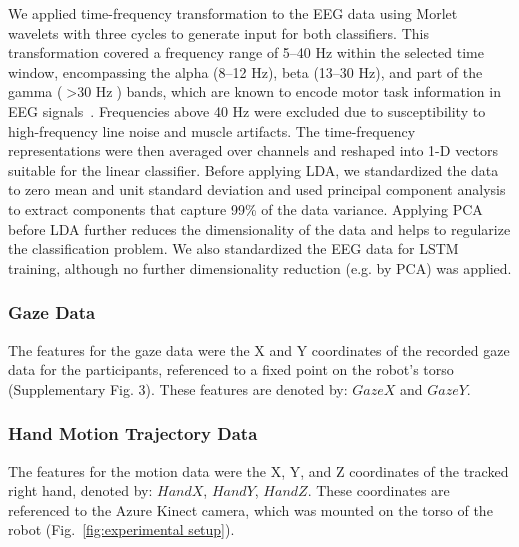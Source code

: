 We applied time-frequency transformation to the EEG data using Morlet wavelets with three cycles to generate input for both classifiers. This transformation covered a frequency range of 5–40 Hz within the selected time window, encompassing the alpha (8–12 Hz), beta (13–30 Hz), and part of the gamma (\(>\text{30 Hz}\)) bands, which are known to encode motor task information in EEG signals~\cite{amo2020induced, yu2022effects}. Frequencies above 40 Hz were excluded due to susceptibility to high-frequency line noise and muscle artifacts. The time-frequency representations were then averaged over channels and reshaped into 1-D vectors suitable for the linear classifier. Before applying LDA, we standardized the data to zero mean and unit standard deviation and used principal component analysis to extract components that capture 99\% of the data variance. Applying PCA before LDA further reduces the dimensionality of the data and helps to regularize the classification problem. We also standardized the EEG data for LSTM training, although no further dimensionality reduction (e.g. by PCA) was applied.  
 
\subsubsection*{Gaze Data}
The features for the gaze data were the X and Y coordinates of the recorded gaze data for the participants, referenced to a fixed point on the robot's torso (Supplementary Fig. 3). These features are denoted by: $GazeX$ and $GazeY$. 

\subsubsection*{Hand Motion Trajectory Data}

The features for the motion data were the X, Y, and Z coordinates of the tracked right hand, denoted by: $HandX$, $HandY$, $HandZ$. These coordinates are referenced to the Azure Kinect camera, which was mounted on the torso of the robot (Fig.~\ref{fig:experimental setup}).

